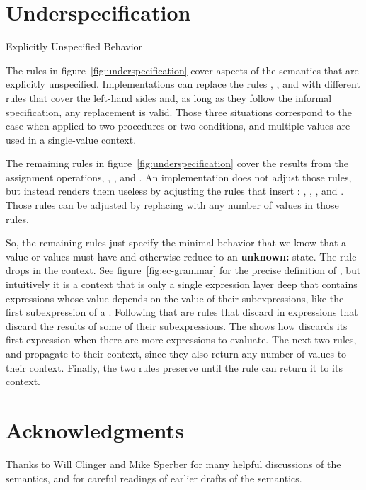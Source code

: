 \section{Underspecification}\label{sec:semantics:underspecification}

\beginfig
\begin{center}

\end{center}
\caption{Explicitly Unspecified Behavior}\label{fig:underspecification}
\endfig

The rules in figure~\ref{fig:underspecification} cover aspects of the
semantics that are explicitly unspecified. Implementations can replace
the rules , ,  and with different rules that cover the left-hand sides and, as long as they follow the informal specification, any replacement is valid. Those three situations correspond to the case when  applied to two procedures or
two conditions, and multiple values are used in a single-value context.

The remaining rules in figure~\ref{fig:underspecification} cover the results from the assignment operations, , , and . An implementation does not adjust those rules, but instead renders them useless by adjusting the rules that insert : , , , and . Those rules can be adjusted by replacing  with any number of values in those rules.

So, the remaining rules just specify the minimal behavior that we know that a value or values must have and otherwise reduce to an \textbf{unknown:} state. The rule  drops  in the  context. See figure~\ref{fig:ec-grammar} for the precise definition of , but intuitively it is a context that is only a single expression layer deep that contains expressions whose value depends on the value of their subexpressions, like the first subexpression of a . Following that are rules that discard  in expressions that discard the results of some of their subexpressions. The  shows how  discards its first expression when there are more expressions to evaluate. The next two rules,  and  propagate  to their context, since they also return any number of values to their context. Finally, the two  rules preserve  until the rule  can return it to its context.

\section*{Acknowledgments}

Thanks to Will Clinger and Mike Sperber for many helpful discussions of the semantics, and for careful readings of earlier drafts of the semantics.

